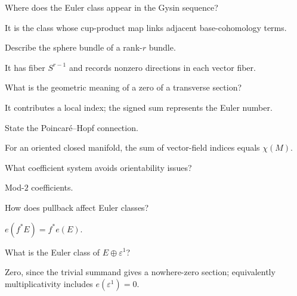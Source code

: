 \begin{problem}
Where does the Euler class appear in the Gysin sequence?
\end{problem}
\begin{solution}
It is the class whose cup-product map links adjacent base-cohomology terms.
\end{solution}

\begin{problem}
Describe the sphere bundle of a rank-$r$ bundle.
\end{problem}
\begin{solution}
It has fiber $S^{r-1}$ and records nonzero directions in each vector fiber.
\end{solution}

\begin{problem}
What is the geometric meaning of a zero of a transverse section?
\end{problem}
\begin{solution}
It contributes a local index; the signed sum represents the Euler number.
\end{solution}

\begin{problem}
State the Poincaré--Hopf connection.
\end{problem}
\begin{solution}
For an oriented closed manifold, the sum of vector-field indices equals $\chi(M)$.
\end{solution}

\begin{problem}
What coefficient system avoids orientability issues?
\end{problem}
\begin{solution}
Mod-$2$ coefficients.
\end{solution}

\begin{problem}
How does pullback affect Euler classes?
\end{problem}
\begin{solution}
$e(f^*E)=f^*e(E)$.
\end{solution}

\begin{problem}
What is the Euler class of $E\oplus\varepsilon^1$?
\end{problem}
\begin{solution}
Zero, since the trivial summand gives a nowhere-zero section; equivalently multiplicativity includes $e(\varepsilon^1)=0$.
\end{solution}

